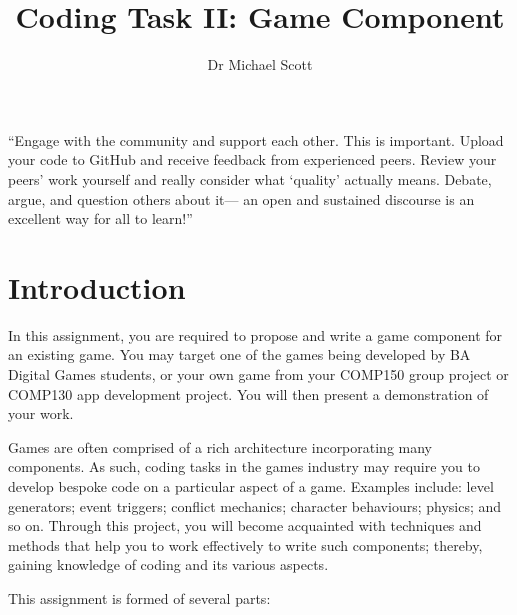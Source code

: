 \documentclass{../fal_assignment}
\title{Coding Task II: Game Component}
\author{Dr Michael Scott}
\begin{document}
\maketitle
\begin{marginquote}
    ``Engage with the community and support each other. This is important.
    Upload your code to GitHub and receive feedback from experienced peers.
    Review your peers' work yourself and really consider what `quality' actually means.
    Debate, argue, and question others about it---
    an open and sustained discourse is an excellent way for all to learn!''
\end{marginquote}

\section*{Introduction}

In this assignment, you are required to propose and write a game component for an existing game.
You may target one of the games being developed by BA Digital Games students, or your own game
from your COMP150 group project or COMP130 app development project.
You will then present a demonstration of your work.

Games are often comprised of a rich architecture incorporating many components. As such, coding tasks in the games industry may require you to develop bespoke code on a particular aspect of a game. Examples include: level generators; event triggers; conflict mechanics; character behaviours; physics; and so on. Through this project, you will become acquainted with techniques and methods that help you to work effectively to write such components; thereby, gaining knowledge of coding and its various aspects.

This assignment is formed of several parts:
\end{document}
